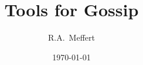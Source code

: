 
\title{Tools for Gossip}
\author{R.A.~Meffert}
\date{\today}


\maketitle
\begin{abstract}

\keywords{}
\end{abstract}

\tableofcontents

\clearpage


